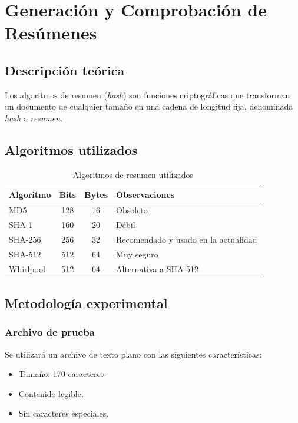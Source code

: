 \chapter{Generación y Comprobación de Resúmenes}

\section{Descripción teórica}

Los algoritmos de resumen (\textit{hash}) son funciones criptográficas que transforman un 
documento de cualquier tamaño en una cadena de longitud fija, denominada \textit{hash} o \textit{resumen}. 

\section{Algoritmos utilizados}

\begin{table}[H]
    \centering
    \caption{Algoritmos de resumen utilizados}
    \begin{tabularx}{\textwidth}{l|c|c|p{5cm}}
        \toprule
        \textbf{Algoritmo} & \textbf{Bits} & \textbf{Bytes} & \textbf{Observaciones} \\
        \midrule
        MD5 & 128 & 16 & Obsoleto \\
        SHA-1 & 160 & 20 & Débil \\
        SHA-256 & 256 & 32 & Recomendado y usado en la actualidad \\
        SHA-512 & 512 & 64 & Muy seguro \\
        Whirlpool & 512 & 64 & Alternativa a SHA-512 \\
        \bottomrule
    \end{tabularx}
\end{table}

\section{Metodología experimental}

\subsection{Archivo de prueba}

Se utilizará un archivo de texto plano con las siguientes características:

\begin{itemize}[label=\textbullet]
    \item Tamaño: 170 caracteres-
    \item Contenido legible.
    \item Sin caracteres especiales.
\end{itemize}
